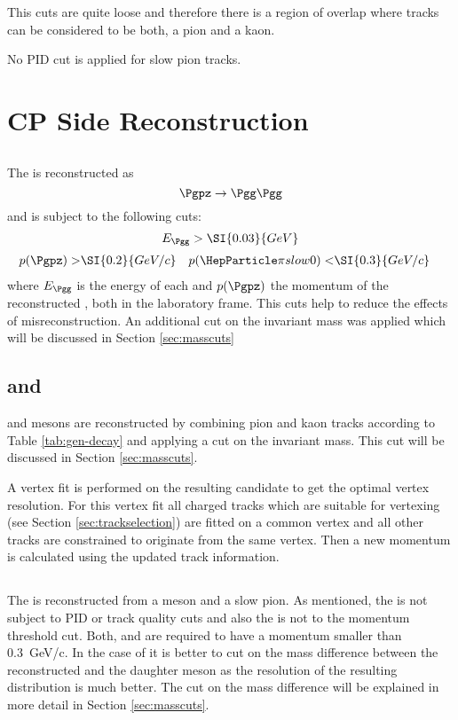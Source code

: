 \documentclass[a4paper]{report}
\begin{document}
This cuts are quite loose and therefore there is a region of overlap where
tracks can be considered to be both, a pion and a kaon.

No PID cut is applied for slow pion tracks.

\section{CP Side Reconstruction}

\subsection{\texorpdfstring{\Pgpz}{pi0}}
The \Pgpz is reconstructed as
\[\Pgpz \rightarrow \Pgg\Pgg\]
and is subject to the following cuts:
\[ E_{\Pgg} > \SI{0.03}{GeV} \]
\begin{align*}
    p(\Pgpz) >& \SI{0.2}{GeV/c}&
    p(\Pgpzs)<& \SI{0.3}{GeV/c}
\end{align*}
where $E_{\Pgg}$ is the energy of each \Pgg  and $p(\Pgpz)$ the momentum of the
reconstructed \Pgpz, both in the laboratory frame. This cuts help to reduce the
effects of misreconstruction. An additional cut on the invariant mass was
applied which will be discussed in Section \ref{sec:masscuts}

\subsection{\texorpdfstring{\PKzS}{K0S}}

\subsection{\texorpdfstring{\PDz and \PDpm}{D0 and D+-}}
\PDz and \PDpm mesons are reconstructed by combining pion and kaon tracks
according to Table \ref{tab:gen-decay} and applying a cut on the invariant mass.
This cut will be discussed in Section \ref{sec:masscuts}.

A vertex fit is performed on the resulting \PD candidate to get the optimal
vertex resolution.  For this vertex fit all charged tracks which are suitable
for vertexing (see Section \ref{sec:trackselection}) are fitted on a common
vertex and all other tracks are constrained to originate from the same vertex.
Then a new \PD momentum is calculated using the updated track information.

\subsection{\texorpdfstring{\PDstpm}{D*+-}}
The \PDstpm is reconstructed from a \PD meson and a slow pion. As mentioned, the
\Pgppms is not subject to PID or track quality cuts and also the \Pgpzs is not
to the \Pgpz momentum threshold cut. Both, \Pgppms and \Pgpzs are required to
have a momentum smaller than \SI{0.3}{GeV/c}. In the case of \PDstpm it is
better to cut on the mass difference between the reconstructed \PDstpm and the
daughter \PD meson as the resolution of the resulting distribution is much
better. The cut on the mass difference will be explained in more detail in
Section \ref{sec:masscuts}.
\end{document}
